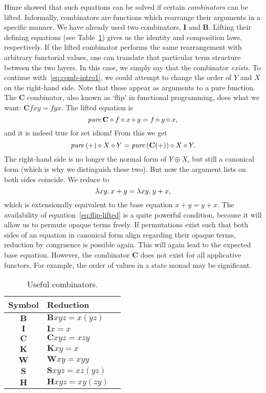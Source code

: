 Hinze showed that such equations can be solved if certain \emph{combinators}
can be lifted.
Informally, combinators are functions which rearrange their arguments in a
specific manner.
We have already used two combinators, $\mathbf{I}$ and $\mathbf{B}$.
Lifting their defining equations (see Table~\ref{tab:combinators}) gives us
the identity and composition laws, respectively.
If the lifted combinator performs the same rearrangement with arbitrary
functorial values, one can translate that particular term structure between the
two layers.
In this case, we simply say that the combinator \emph{exists}.
To continue with~\eqref{eq:comb-intro1}, we could attempt to change the order of
$Y$ and $X$ on the right-hand side.
Note that these appear as arguments to a pure function.
The $\mathbf{C}$ combinator, also known as `flip' in functional programming,
does what we want: $\mathbf{C}fxy = fyx$.
The lifted equation is
\begin{equation}\label{eq:flip-lifted}
	\operatorname{\mathit{pure}} \mathbf{C} \diamond f \diamond x \diamond y = f \diamond y \diamond x,
\end{equation}
and it is indeed true for set idiom!
From this we get
\begin{equation}\label{eq:comb-intro2}
	\operatorname{\mathit{pure}}{(+)} \diamond X \diamond Y = \operatorname{\mathit{pure}}{(\mathbf{C}(+))} \diamond X \diamond Y.
\end{equation}
The right-hand side is no longer the normal form of $Y \oplus X$, but still
a canonical form (which is why we distinguish these two).
But now the argument lists on both sides coincide.
We reduce to
\[ \lambda xy.\>x + y = \lambda xy.\>y + x, \]
which is extensionally equivalent to the base equation $x + y = y + x$.
The availability of equation~\eqref{eq:flip-lifted} is a quite powerful
condition, because it will allow us to permute opaque terms freely.
If permutations exist such that both sides of an equation in canonical form
align regarding their opaque terms, reduction by congruence is possible again.
This will again lead to the expected base equation.
However, the combinator $\mathbf{C}$ does not exist for all applicative functors.
For example, the order of values in a state monad may be significant.

\begin{table}\centering
\begin{tabular}{cll}
Symbol & Reduction \\
\hline
$\mathbf{B}$ & $\mathbf{B} x y z = x (y z)$ \\
$\mathbf{I}$ & $\mathbf{I} x = x$ \\
\hline
$\mathbf{C}$ & $\mathbf{C} x y z = x z y$ \\
$\mathbf{K}$ & $\mathbf{K} x y = x$ \\
$\mathbf{W}$ & $\mathbf{W} x y = x y y$ \\
$\mathbf{S}$ & $\mathbf{S} x y z = x z (y z)$ \\
$\mathbf{H}$ & $\mathbf{H} x y z = x y (z y)$ \\
\end{tabular}
\caption{Useful combinators.}
\label{tab:combinators}
\end{table}

